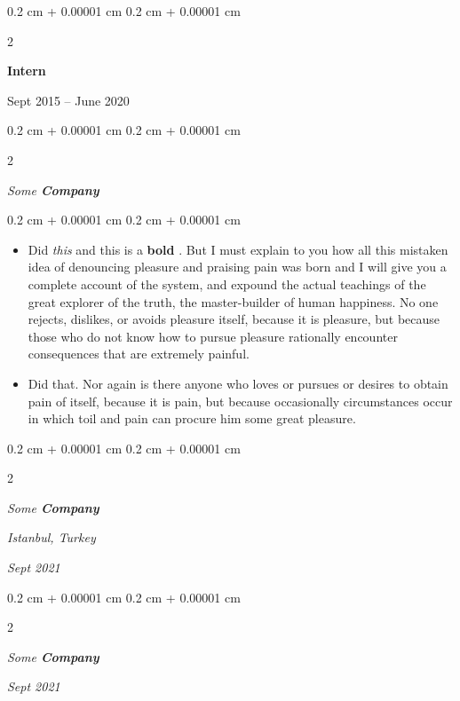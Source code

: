 \documentclass[10pt, letterpaper]{article}
\newenvironment{highlights}{
    \begin{itemize}[
        topsep=0.10 cm,
        parsep=0.10 cm,
        partopsep=0pt,
        itemsep=0pt,
        leftmargin=0.4 cm + 10pt
    ]
}{
    \end{itemize}
} %
\newenvironment{onecolentry}{
    \begin{adjustwidth}{
        0.2 cm + 0.00001 cm
    }{
        0.2 cm + 0.00001 cm
    }
}{
    \end{adjustwidth}
} %
\newenvironment{twocolentry}[2][]{
    \onecolentry
    \def\secondColumn{#2}
    \setcolumnwidth{\fill, 4.5 cm}
    \begin{paracol}{2}
}{
    \switchcolumn \raggedleft \secondColumn
    \end{paracol}
    \endonecolentry
} %
\let\hrefWithoutArrow\href
\renewcommand{\href}[2]{\hrefWithoutArrow{#1}{\ifthenelse{\equal{#2}{}}{ }{#2 }\raisebox{.15ex}{\footnotesize \faExternalLink*}}}
\begin{document}
                \begin{twocolentry}{
                    Sept 2015 – June 2020
                }
                \textbf{Intern}
                \end{twocolentry}
            \begin{twocolentry}{
            }
            \textit{Some \textbf{Company}}
            \end{twocolentry}

        \vspace{0.10 cm}
        \begin{onecolentry}
            \begin{highlights}
                \item Did \textit{this} and this is a \textbf{bold} \href{https://example.com}{link}. But I must explain to you how all this mistaken idea of denouncing pleasure and praising pain was born and I will give you a complete account of the system, and expound the actual teachings of the great explorer of the truth, the master-builder of human happiness. No one rejects, dislikes, or avoids pleasure itself, because it is pleasure, but because those who do not know how to pursue pleasure rationally encounter consequences that are extremely painful.
                \item Did that. Nor again is there anyone who loves or pursues or desires to obtain pain of itself, because it is pain, but because occasionally circumstances occur in which toil and pain can procure him some great pleasure.
            \end{highlights}
        \end{onecolentry}


        \vspace{0.2 cm}

            \begin{twocolentry}{
        \textit{Istanbul, Turkey}

        \textit{Sept 2021}    }
                \textbf{}

                \textit{Some \textbf{Company}}
            \end{twocolentry}



        \vspace{0.2 cm}

            \begin{twocolentry}{


        \textit{Sept 2021}    }
                \textbf{}

                \textit{Some \textbf{Company}}
            \end{twocolentry}
\end{document}

